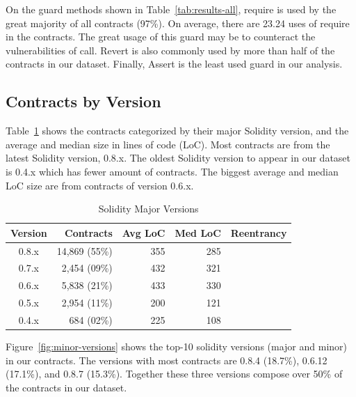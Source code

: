 \documentclass[10pt,conference]{IEEEtran}
\begin{document}
On the guard methods shown in Table~\ref{tab:results-all}, require is used by the great majority of all contracts (97\%). On average, there are 23.24 uses of require in the contracts. The great usage of this guard may be to counteract the vulnerabilities of call. Revert is also commonly used by more than half of the contracts in our dataset. Finally, Assert is the least used guard in our analysis.



\subsection{Contracts by Version}

Table~\ref{tab:major-versions} shows the contracts categorized by their major Solidity version, and the average and median size in lines of code (LoC). Most contracts are from the latest Solidity version, 0.8.x. The oldest Solidity version to appear in our dataset is 0.4.x which has fewer amount of contracts. The biggest average and median LoC size are from contracts of version 0.6.x.


\begin{table}
\center
  \caption{Solidity Major Versions}
  \label{tab:major-versions}
  \begin{tabular}{crrrr}
    \hline
    Version & Contracts & Avg LoC & Med LoC & Reentrancy \\
    \hline
    0.8.x & 14,869 (55\%) & 355 & 285 \\
    0.7.x & 2,454 (09\%) & 432 & 321 \\
    0.6.x & 5,838 (21\%) & 433 & 330 \\
    0.5.x & 2,954 (11\%) & 200 & 121 \\
    0.4.x & 684  (02\%) & 225 & 108 \\
  \hline
\end{tabular}
\end{table}

Figure~\ref{fig:minor-versions} shows the top-10 solidity versions (major and minor) in our contracts. The versions with most contracts are 0.8.4 (18.7\%), 0.6.12 (17.1\%), and 0.8.7 (15.3\%). Together these three versions compose over 50\% of the contracts in our dataset.
\end{document}
